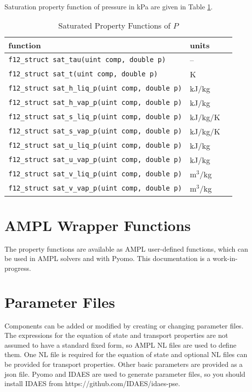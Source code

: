 \documentclass[oneside]{book}
\begin{document}
Saturation property function of pressure in kPa are given in Table \ref{table:sat_props_p}.

\begin{table}[h!]
\centering
\caption{Saturated Property Functions of $P$}
\begin{tabular}{ l l l }
\hline
function & units \\
\hline
\hline
\texttt{f12\_struct sat\_tau(uint comp, double p)} & -- \\ [1ex]
\texttt{f12\_struct sat\_t(uint comp, double p)} & K \\ [1ex]
\texttt{f12\_struct sat\_h\_liq\_p(uint comp, double p)} & kJ/kg \\ [1ex]
\texttt{f12\_struct sat\_h\_vap\_p(uint comp, double p)} & kJ/kg \\ [1ex]
\texttt{f12\_struct sat\_s\_liq\_p(uint comp, double p)} & kJ/kg/K \\ [1ex]
\texttt{f12\_struct sat\_s\_vap\_p(uint comp, double p)} & kJ/kg/K \\ [1ex]
\texttt{f12\_struct sat\_u\_liq\_p(uint comp, double p)} & kJ/kg \\ [1ex]
\texttt{f12\_struct sat\_u\_vap\_p(uint comp, double p)} & kJ/kg \\ [1ex]
\texttt{f12\_struct sat\_v\_liq\_p(uint comp, double p)} & m$^3$/kg \\ [1ex]
\texttt{f12\_struct sat\_v\_vap\_p(uint comp, double p)} & m$^3$/kg \\ [1ex]
 \hline    
\end{tabular}
\label{table:sat_props_p}
\end{table}

\chapter{AMPL Wrapper Functions}

The property functions are available as AMPL user-defined functions, which can be used in AMPL solvers and with Pyomo.  This documentation is a work-in-progress.

\chapter{Parameter Files}

Components can be added or modified by creating or changing parameter files.  The expressions for the equation of state and transport properties are not assumed to have a standard fixed form, so AMPL NL files are used to define them.  One NL file is required for the equation of state and optional NL files can be provided for transport properties.  Other basic parameters are provided as a json file.  Pyomo \cite{bynum2021pyomo} and IDAES are used to generate parameter files, so you should install IDAES from https://github.com/IDAES/idaes-pse.
\end{document}
